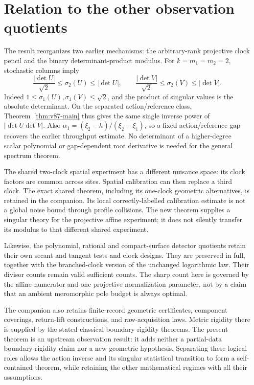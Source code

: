 \documentclass[11pt,reqno]{amsart}
\numberwithin{equation}{section}
\theoremstyle{definition}\newtheorem{definition}[theorem]{Definition}
\theoremstyle{remark}\newtheorem{remark}[theorem]{Remark}
\begin{document}
\section{Relation to the other observation quotients}
\label{sec:v87-relations}
The result reorganizes two earlier mechanisms: the arbitrary-rank
projective clock pencil and the binary determinant-product modulus.
For $k=m_1=m_2=2$, stochastic columns imply
\[
 \frac{|\det U|}{\sqrt2}\le\sigma_2(U)\le|\det U|,
 \qquad
 \frac{|\det V|}{\sqrt2}\le\sigma_2(V)\le|\det V|.
\]
Indeed $1\le\sigma_1(U),\sigma_1(V)\le\sqrt2$, and the product
of singular values is the absolute determinant. On the separated
action/reference class, Theorem~\ref{thm:v87-main} thus gives the
same single inverse power of $|\det U\det V|$. Also
$\alpha_1=(\xi_2-h)/(\xi_2-\xi_1)$, so a fixed action/reference
gap recovers the earlier throughput estimate. No determinant of
a higher-degree scalar polynomial or gap-dependent root derivative
is needed for the general spectrum theorem.

The shared two-clock spatial experiment has a different nuisance
space: its clock factors are common across sites. Spatial calibration
can then replace a third clock. The exact shared theorem, including
its one-clock geometric alternatives, is retained in the companion.
Its local correctly-labelled calibration estimate is not a global
noise bound through profile collisions. The new theorem supplies a
singular theory for the projective affine experiment; it does not
silently transfer its modulus to that different shared experiment.

Likewise, the polynomial, rational and compact-surface detector
quotients retain their own secant and tangent tests and clock designs.
They are preserved in full, together with the branched-clock version
of the unchanged logarithmic law. Their divisor counts remain valid
sufficient counts. The sharp count here is governed by the affine
numerator and one projective normalization parameter, not by a claim
that an ambient meromorphic pole budget is always optimal.

The companion also retains finite-record geometric certificates,
component coverings, return-lift constructions, and raw-acquisition
laws. Metric rigidity there is supplied by the stated classical
boundary-rigidity theorems. The present theorem is an upstream
observation result: it adds neither a partial-data boundary-rigidity
claim nor a new geometric hypothesis. Separating these logical roles
allows the action inverse and its singular statistical transition to
form a self-contained theorem, while retaining the other mathematical
regimes with all their assumptions.
\end{document}
